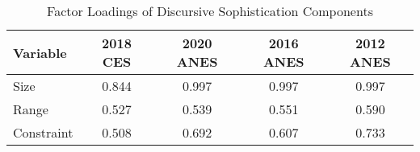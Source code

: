 \begin{table}[ht]
\centering
\begin{tabular}{lcccc}
  \hline
Variable & 2018 CES & 2020 ANES & 2016 ANES & 2012 ANES \\ 
  \hline
Size & 0.844 & 0.997 & 0.997 & 0.997 \\ 
  Range & 0.527 & 0.539 & 0.551 & 0.590 \\ 
  Constraint & 0.508 & 0.692 & 0.607 & 0.733 \\ 
   \hline
\end{tabular}
\caption{Factor Loadings of Discursive Sophistication Components} 
\label{tab:factload}
\end{table}
